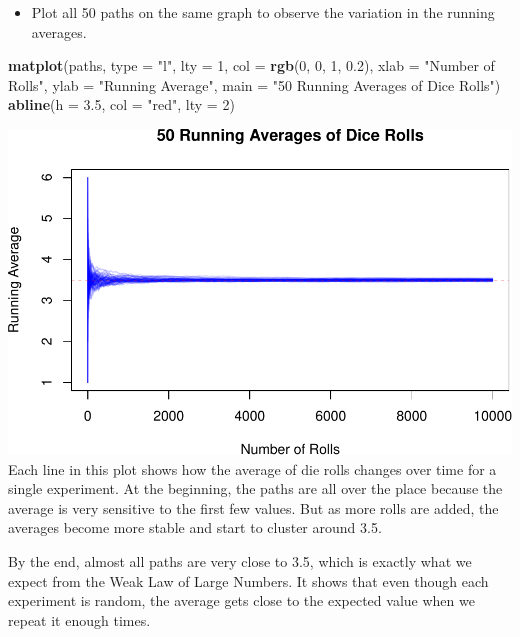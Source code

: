 \documentclass[
]{article}
\newenvironment{Shaded}{\begin{snugshade}}{\end{snugshade}}
\newcommand{\AttributeTok}[1]{\textcolor[rgb]{0.13,0.29,0.53}{#1}}
\newcommand{\DecValTok}[1]{\textcolor[rgb]{0.00,0.00,0.81}{#1}}
\newcommand{\FloatTok}[1]{\textcolor[rgb]{0.00,0.00,0.81}{#1}}
\newcommand{\FunctionTok}[1]{\textcolor[rgb]{0.13,0.29,0.53}{\textbf{#1}}}
\newcommand{\NormalTok}[1]{#1}
\newcommand{\StringTok}[1]{\textcolor[rgb]{0.31,0.60,0.02}{#1}}
\providecommand{\tightlist}{%
  \setlength{\itemsep}{0pt}\setlength{\parskip}{0pt}}
\begin{document}
\begin{itemize}
\tightlist
\item
  Plot all 50 paths on the same graph to observe the variation in the
  running averages.
\end{itemize}

\begin{Shaded}
\begin{Highlighting}[]
\FunctionTok{matplot}\NormalTok{(paths, }\AttributeTok{type =} \StringTok{"l"}\NormalTok{, }\AttributeTok{lty =} \DecValTok{1}\NormalTok{, }\AttributeTok{col =} \FunctionTok{rgb}\NormalTok{(}\DecValTok{0}\NormalTok{, }\DecValTok{0}\NormalTok{, }\DecValTok{1}\NormalTok{, }\FloatTok{0.2}\NormalTok{),}
        \AttributeTok{xlab =} \StringTok{"Number of Rolls"}\NormalTok{, }\AttributeTok{ylab =} \StringTok{"Running Average"}\NormalTok{,}
        \AttributeTok{main =} \StringTok{"50 Running Averages of Dice Rolls"}\NormalTok{)}
\FunctionTok{abline}\NormalTok{(}\AttributeTok{h =} \FloatTok{3.5}\NormalTok{, }\AttributeTok{col =} \StringTok{"red"}\NormalTok{, }\AttributeTok{lty =} \DecValTok{2}\NormalTok{)}
\end{Highlighting}
\end{Shaded}

\includegraphics{CS1_files/figure-latex/unnamed-chunk-13-1.pdf} Each
line in this plot shows how the average of die rolls changes over time
for a single experiment. At the beginning, the paths are all over the
place because the average is very sensitive to the first few values. But
as more rolls are added, the averages become more stable and start to
cluster around 3.5.

By the end, almost all paths are very close to 3.5, which is exactly
what we expect from the Weak Law of Large Numbers. It shows that even
though each experiment is random, the average gets close to the expected
value when we repeat it enough times.
\end{document}
